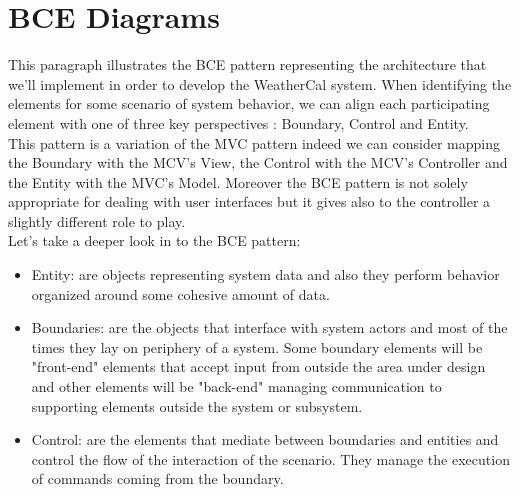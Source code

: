 \section{BCE Diagrams}
This paragraph illustrates the BCE pattern representing the architecture that we'll implement in order to develop the WeatherCal system. When identifying the elements for some scenario of system behavior, we can align each participating element with one of three key perspectives : Boundary, Control and Entity. \\This  pattern is a variation of the MVC pattern indeed we can consider mapping the Boundary with the MCV's View, the Control with the MCV's Controller and the Entity with the MVC's Model. Moreover the BCE pattern is not solely appropriate for dealing with user interfaces but it gives also to the controller a slightly different role to play.\\Let's take a deeper look in to the BCE pattern:\begin{itemize}
\item Entity: are objects representing system data and also they perform behavior organized around some cohesive amount of data.
\item Boundaries: are the objects that interface with system actors and most of the times they lay on periphery of a system. Some boundary elements will be "front-end" elements that accept input from outside the area under design and other elements will be "back-end" managing communication to supporting elements outside the system or subsystem.
\item Control: are the elements that mediate between boundaries and entities and control the flow of the interaction of the scenario. They manage the execution of commands coming from the boundary.

\end{itemize}

